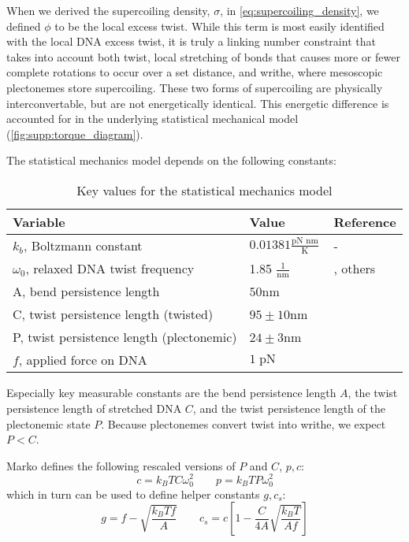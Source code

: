 \documentclass[11pt]{article}
\newcommand{\units}[2]{\frac{\text{#1}}{\text{#2}}\,}
\newcommand{\unit}[1]{\; \text{#1}\,}
\begin{document}
When we derived the supercoiling density, \(\sigma\), in \cref{eq:supercoiling_density}, we defined \(\phi\) to be the local excess twist. While this term is most easily identified with the local DNA excess twist, it is truly a linking number constraint that takes into account both twist, local stretching of bonds that causes more or fewer complete rotations to occur over a set distance, and writhe, where mesoscopic plectonemes store supercoiling. These two forms of supercoiling are physically interconvertable, but are not energetically identical. This energetic difference is accounted for in the underlying statistical mechanical model (\cref{fig:supp:torque_diagram}).

The statistical mechanics model depends on the following constants:
\begin{table}[h]
    \centering
    \begin{tabular}{@{}lll@{}}
        \toprule
        Variable & Value & Reference \\
        \midrule
        \(k_b\), Boltzmann constant & \(0.01381 \units{pN nm}{K}\) & - \\
        \(\omega_0\), relaxed DNA twist frequency & 1.85 \(\units{1}{nm}\) & \parencite{sevierPropertiesGeneExpression2018}, others \\
        \midrule
        A, bend persistence length & \(50\)nm & \parencite{markoTorqueDynamicsLinking2007} \\
        C, twist persistence length (twisted) & \(95 \pm 10\)nm & \parencite{markoTorqueDynamicsLinking2007} \\
        P, twist persistence length (plectonemic) & \(24 \pm 3\)nm & \parencite{markoTorqueDynamicsLinking2007} \\
        \(f\), applied force on DNA & \(1 \unit{pN}\) & \parencite{sevierPropertiesGeneExpression2018} \\
        \bottomrule
    \end{tabular}
    \caption{Key values for the statistical mechanics model}
    \label{tab:constants}
\end{table}
\FloatBarrier
Especially key measurable constants are the bend persistence length \(A\), the twist persistence length of stretched DNA \(C\), and the twist persistence length of the plectonemic
state \(P\). Because plectonemes convert twist into writhe, we expect \(P < C\).

Marko defines the following rescaled versions of \(P\) and \(C\), \(p,c\):
\[c = k_B T C \omega_0^2 \qquad p = k_B T P \omega_0^2\]
which in turn can be used to define helper constants \(g, c_s\):
\[g = f - \sqrt{\frac{k_B T f}{A}} \qquad c_s = c \left[1 - \frac{C}{4A} \sqrt{\frac{k_B T}{A f}}\right]\]
\end{document}
